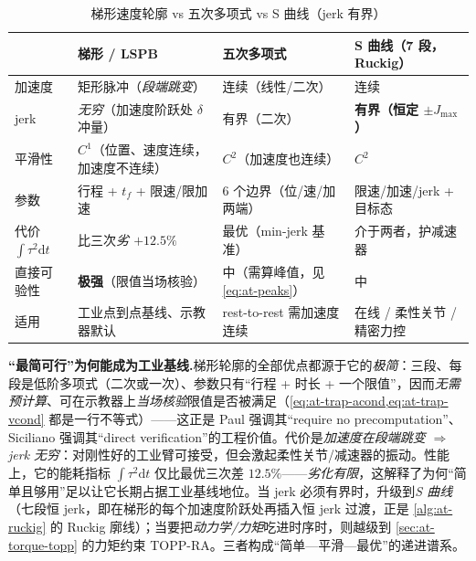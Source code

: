 \begin{table}[H]\centering\small
\caption{梯形速度轮廓 vs 五次多项式 vs S 曲线（jerk 有界）}
\label{tab:at-trap-cmp}
\begin{tabular}{p{} p{} p{} p{}}
\toprule
 & 梯形 / LSPB & 五次多项式 & S 曲线（7 段，Ruckig） \\
\midrule
加速度 & 矩形脉冲（\emph{段端跳变}） & 连续（线性/二次） & 连续 \\
jerk & \emph{无穷}（加速度阶跃处 $\delta$ 冲量） & 有界（二次） & \textbf{有界（恒定 $\pm J_{\max}$）} \\
平滑性 & $C^1$（位置、速度连续，加速度不连续） & $C^2$（加速度也连续） & $C^2$ \\
参数 & 行程 + $t_f$ + 限速/限加速 & 6 个边界（位/速/加 两端） & 限速/加速/jerk + 目标态 \\
代价 $\int\!\tau^2\mathrm dt$ & 比三次\emph{劣 $+12.5\%$}\cite{siciliano2009robotics} & 最优（min-jerk 基准） & 介于两者，护减速器 \\
直接可验性 & \textbf{极强}（限值当场核验） & 中（需算峰值，见 \cref{eq:at-peaks}） & 中 \\
适用 & 工业点到点基线、示教器默认 & rest-to-rest 需加速度连续 & 在线 / 柔性关节 / 精密力控 \\
\bottomrule
\end{tabular}
\end{table}

\begin{insight}
\textbf{“最简可行”为何能成为工业基线.}\;梯形轮廓的全部优点都源于它的\emph{极简}：三段、每段是低阶多项式（二次或一次）、参数只有“行程 + 时长 + 一个限值”，因而\emph{无需预计算}、可在示教器上\emph{当场核验}限值是否被满足（\cref{eq:at-trap-acond,eq:at-trap-vcond} 都是一行不等式）——这正是 Paul 强调其“require no precomputation”、Siciliano 强调其“direct verification”的工程价值\cite{paul1981robot,siciliano2009robotics}。代价是\emph{加速度在段端跳变 $\Rightarrow$ jerk 无穷}：对刚性好的工业臂可接受，但会激起柔性关节/减速器的振动。性能上，它的能耗指标 $\int\tau^2\mathrm dt$ 仅比最优三次差 $12.5\%$\cite{siciliano2009robotics}——\emph{劣化有限}，这解释了为何“简单且够用”足以让它长期占据工业基线地位。当 jerk 必须有界时，升级到\emph{S 曲线}（七段恒 jerk，即在梯形的每个加速度阶跃处再插入恒 jerk 过渡，正是 \cref{alg:at-ruckig} 的 Ruckig 廓线）；当要把\emph{动力学/力矩}吃进时序时，则越级到 \cref{sec:at-torque-topp} 的力矩约束 TOPP-RA。三者构成“简单—平滑—最优”的递进谱系。
\end{insight}

